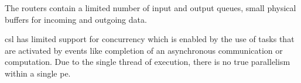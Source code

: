 The routers contain a limited number of input and output queues, small physical buffers for incoming and outgoing data.

\ac{csl} has limited support for concurrency which is enabled by the use of tasks that are activated by events like completion of an asynchronous communication or computation. Due to the single thread of execution, there is no true parallelism within a single \ac{pe}.


